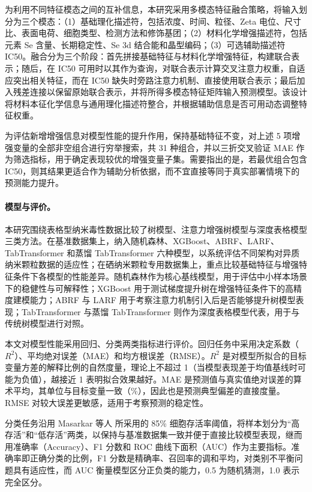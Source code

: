 为利用不同特征模态之间的互补信息，本研究采用多模态特征融合策略，将输入划分为三个模态：（1）基础理化描述符，包括浓度、时间、粒径、Zeta 电位、尺寸比、表面电荷、细胞类型、检测方法和修饰基团；（2）材料化学增强描述符，包括元素 Se 含量、长期稳定性、Se 3d 结合能和晶型编码；（3）可选辅助描述符 IC50。融合分为三个阶段：首先拼接基础特征与材料化学增强特征，构建联合表示；随后，在 IC50 可用时以其作为查询，对联合表示计算交叉注意力权重，自适应突出相关特征，而在 IC50 缺失时旁路注意力机制、直接使用联合表示；最后加入残差连接以保留原始联合表示，并将所得多模态特征矩阵输入预测模型。该设计将材料本征化学信息与通用理化描述符整合，并根据辅助信息是否可用动态调整特征权重。

为评估新增增强信息对模型性能的提升作用，保持基础特征不变，对上述 5 项增强变量的全部非空组合进行穷举搜索，共 31 种组合，并以三折交叉验证 MAE 作为筛选指标，用于确定表现较优的增强变量子集。需要指出的是，若最优组合包含 IC50，则其结果更适合作为辅助分析依据，而不宜直接等同于真实部署情境下的预测能力提升。

\paragraph{模型与评价。}
本研究围绕表格型纳米毒性数据比较了树模型、注意力增强树模型与深度表格模型三类方法。在基准数据集上，纳入随机森林、XGBoost、ABRF、LARF、TabTransformer 和蒸馏 TabTransformer 六种模型，以系统评估不同架构对异质纳米颗粒数据的适应性；在硒纳米颗粒专用数据集上，重点比较基础特征与增强特征条件下各模型的性能差异。随机森林作为核心基线模型，用于评估中小样本场景下的稳健性与可解释性；XGBoost 用于测试梯度提升树在增强特征条件下的高精度建模能力；ABRF 与 LARF 用于考察注意力机制引入后是否能够提升树模型表现；TabTransformer 与蒸馏 TabTransformer 则作为深度表格模型代表，用于与传统树模型进行对照。

本文对模型性能采用回归、分类两类指标进行评价。回归任务中采用决定系数（\(R^2\)）、平均绝对误差（MAE）和均方根误差（RMSE）。\(R^2\) 是对模型所拟合的目标变量方差的解释比例的自然度量，理论上不超过 1（当模型表现差于均值基线时可能为负值），越接近 1 表明拟合效果越好。MAE 是预测值与真实值绝对误差的算术平均，其单位与目标变量一致（\%），因此也是预测典型偏差的直接度量。RMSE 对较大误差更敏感，适用于考察预测的稳定性。

分类任务沿用 Masarkar 等人\cite{masarkar2024} 所采用的 85\% 细胞存活率阈值，将样本划分为“高存活”和“低存活”两类，以保持与基准数据集一致并便于直接比较模型表现，继而用准确率（Accuracy）、F1 分数和 ROC 曲线下面积（AUC）作为主要指标。准确率即正确分类的比例，F1 分数是精确率、召回率的调和平均，对类别不平衡问题具有适应性，而 AUC 衡量模型区分正负类的能力，0.5 为随机猜测，1.0 表示完全区分。


